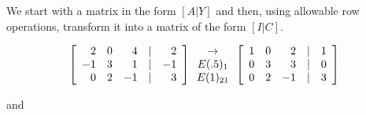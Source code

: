 \begin{large}
We start with a matrix in the form $[A | Y]$ and then, using allowable row operations, transform it into a matrix of the form $[I | C].$\nl


\begin{equation*}
\left[
\begin{array}{rrrcr}
2&0&4&|&2\\
-1&3&1&|&-1\\
0&2&-1&|&3\\
\end{array}
\right]
\begin{array}{c}
\to\\
E(.5)_{1}\\
E(1)_{21}\\
\end{array}
\left[
\begin{array}{rrrcr}
1&0&2&|&1\\
0&3&3&|&0\\
0&2&-1&|&3\\
\end{array}
\right]
\end{equation*}\nl
\begin{center}
and\nl
\end{center}



\end{large}
